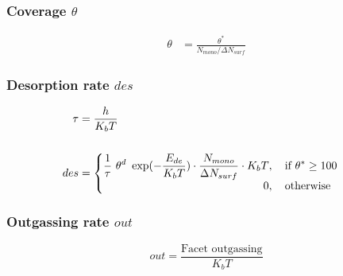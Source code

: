 \subsubsection*{Coverage $\theta$}
\begin{equation}
	\label{eq:cov}
	\begin{split}
		\theta&=\frac{\theta^*}{N_{mono}/\Delta N_{surf}}
	\end{split}
\end{equation}


\subsubsection*{Desorption rate $des$}
\begin{equation}
	\label{eq:des}
	\begin{split}
	\tau&=\frac{h}{K_b T}\\
	&\\
	des&=
	\begin{cases}
		\begin{split}
		\frac{1}{\tau}\ \theta^d\ \exp({-\frac{E_{de}}{K_b T}})\cdot \frac{N_{mono}}{\Delta N_{surf}}\cdot K_b T&, \text{\quad if}\ \theta^* \geq 100\\
		0&,  \text{\quad otherwise}
		\end{split}
	\end{cases}
	\end{split}
\end{equation}

\subsubsection*{Outgassing rate $out$}
\begin{equation}
	\label{eq:out}
	out=\frac{\text{Facet outgassing}}{K_b T}
\end{equation}

